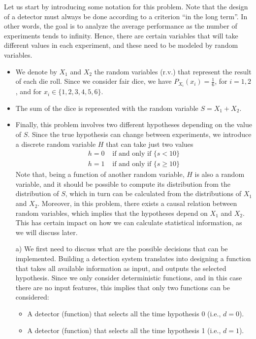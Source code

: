\begin{solution}
Let us start by introducing some notation for this problem. Note that the design of a detector must always be done according to a criterion ``in the long term''. In other words, the goal is to analyze the average performance as the number of experiments tends to infinity. Hence, there are certain variables that will take different values in each experiment, and these need to be modeled by random variables.

    \begin{itemize}
    \item We denote by $X_1$ and $X_2$ the random variables (r.v.) that represent the result of each die roll. Since we consider fair dice, we have $P_{X_i}(x_i) = \frac{1}{6}$, for $i=1,2$, and for $x_i \in \{1, 2, 3, 4, 5, 6\}$.
    \item The sum of the dice is represented with the random variable $S = X_1 + X_2$.
    \item Finally, this problem involves two different hypotheses depending on the value of $S$. Since the true hypothesis can change between experiments, we introduce a discrete random variable $H$ that can take just two values
    \begin{align}
    h=0 & \text{~if and only if } \{s<10\} \nonumber \\
    h=1 & \text{~if and only if } \{s\geq10\} \nonumber
    \end{align}
    Note that, being a function of another random variable, $H$ is also a random variable, and it should be possible to compute its distribution from the distribution of $S$, which in turn can be calculated from the distributions of $X_1$ and $X_2$. Moreover, in this problem, there exists a causal relation between random variables, which implies that the hypotheses depend on $X_1$ and $X_2$. This has certain impact on how we can calculate statistical information, as we will discuss later.

    \end{itemize}
    

\begin{itemize}
    \item [a)] We first need to discuss what are the possible decisions that can be implemented. Building a detection system translates into designing a function that takes all available information as input, and outputs the selected hypothesis. Since we only consider deterministic functions, and in this case there are no input features, this implies that only two functions can be considered:
    \begin{itemize}
        \item A detector (function) that selects all the time hypothesis 0 (i.e., $d=0$).
        \item A detector (function) that selects all the time hypothesis 1 (i.e., $d=1$).
    \end{itemize}
    

\end{itemize}
\end{solution}
